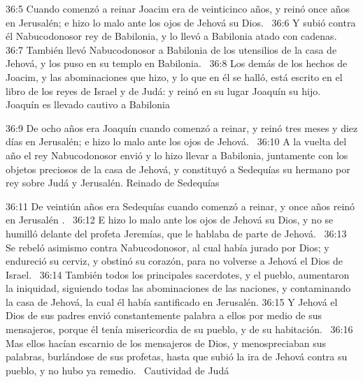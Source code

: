 																																				36:5 Cuando comenzó a reinar Joacim era de veinticinco años, y reinó once años en Jerusalén; e hizo lo malo ante los ojos de Jehová su Dios.  
																																				36:6 Y subió contra él Nabucodonosor rey de Babilonia, y lo llevó a Babilonia atado con cadenas.  
																																				36:7 También llevó Nabucodonosor a Babilonia de los utensilios de la casa de Jehová, y los puso en su templo en Babilonia.  
																																				36:8 Los demás de los hechos de Joacim, y las abominaciones que hizo, y lo que en él se halló, está escrito en el libro de los reyes de Israel y de Judá: y reinó en su lugar Joaquín su hijo.  
																																				Joaquín es llevado cautivo a Babilonia 
																																				
																																				36:9 De ocho años era Joaquín cuando comenzó a reinar, y reinó tres meses y diez días en Jerusalén; e hizo lo malo ante los ojos de Jehová.  
																																				36:10 A la vuelta del año el rey Nabucodonosor envió y lo hizo llevar a Babilonia, juntamente con los objetos preciosos de la casa de Jehová, y constituyó a Sedequías su hermano por rey sobre Judá y Jerusalén. 
																																				Reinado de Sedequías 
																																				
																																				36:11 De veintiún años era Sedequías cuando comenzó a reinar, y once años reinó en Jerusalén .  
																																				36:12 E hizo lo malo ante los ojos de Jehová su Dios, y no se humilló delante del profeta Jeremías, que le hablaba de parte de Jehová.  
																																				36:13 Se rebeló asimismo contra Nabucodonosor, al cual había jurado por Dios; y endureció su cerviz, y obstinó su corazón, para no volverse a Jehová el Dios de Israel.  
																																				36:14 También todos los principales sacerdotes, y el pueblo, aumentaron la iniquidad, siguiendo todas las abominaciones de las naciones, y contaminando la casa de Jehová, la cual él había santificado en Jerusalén. 
																																				36:15 Y Jehová el Dios de sus padres envió constantemente palabra a ellos por medio de sus mensajeros, porque él tenía misericordia de su pueblo, y de su habitación.  
																																				36:16 Mas ellos hacían escarnio de los mensajeros de Dios, y menospreciaban sus palabras, burlándose de sus profetas, hasta que subió la ira de Jehová contra su pueblo, y no hubo ya remedio.  
																																				Cautividad de Judá 
																																				
